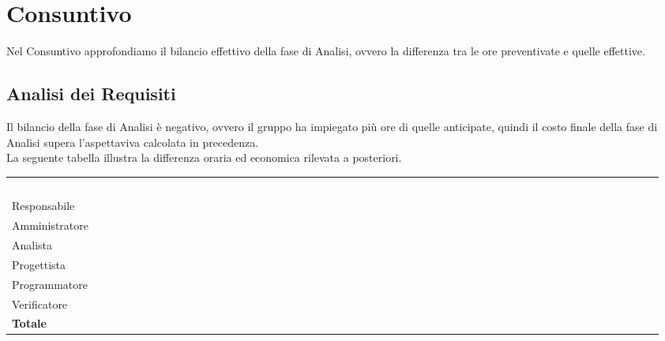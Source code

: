 \section{Consuntivo}

Nel Consuntivo approfondiamo il bilancio effettivo della fase di Analisi, ovvero la differenza tra le ore preventivate e quelle effettive.

\subsection{Analisi dei Requisiti}

Il bilancio della fase di Analisi è negativo, ovvero il gruppo ha impiegato più ore di quelle anticipate, quindi il costo finale della fase di Analisi supera l'aspettaviva calcolata in precedenza.\\
La seguente tabella illustra la differenza oraria ed economica rilevata a posteriori.

\renewcommand{\arraystretch}{2}
\centering
\begin{longtable}{ C{5cm} C{1cm} C{1cm} C{1cm} C{1cm} C{1cm} C{1cm} C{3cm}}
	\textcolor{white}{\textbf{Ruolo}} & \textcolor{white}{\textbf{Ore preventivate}} & \textcolor{white}{\textbf{Ore supplementari}} & \textcolor{white}{\textbf{Costo preventivato}} & \textcolor{white}{\textbf{Costo effettivo}} & \textcolor{white}{\textbf{Differenza di costo}}\\	
	
	Responsabile & & & & & \\
	Amministratore & & & & & \\
	Analista & & & & & \\
	Progettista & & & & & \\
	Programmatore & & & & & \\
	Verificatore & & & & & \\
	\textbf{Totale} & & & & & & \\
	
\end{longtable}